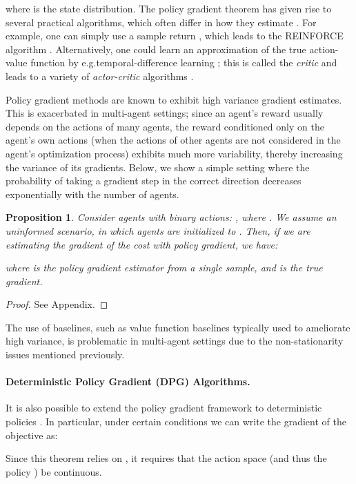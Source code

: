 \documentclass{article}
\newtheorem{prop}{Proposition}
\begin{document}
where  is the state distribution. The policy gradient theorem has given rise to several practical algorithms, which often differ in how they estimate . For example, one can simply use a sample return , which leads to the REINFORCE algorithm \cite{williams1992simple}. 
Alternatively, one could learn an approximation of the true action-value function  by e.g.\@ temporal-difference learning \cite{sutton1998reinforcement}; 
this  is called the \textit{critic} and leads to a variety of \textit{actor-critic} algorithms \cite{sutton1998reinforcement}.

Policy gradient methods are known to exhibit high variance gradient estimates.  This is exacerbated in multi-agent settings; since an agent's reward usually depends on the actions of many agents, the reward conditioned only on the agent's own actions (when the actions of other agents are not considered in the agent's optimization process) exhibits much more variability, thereby increasing the variance of its gradients.
Below, we show a simple setting where the probability of taking a gradient step in the correct direction decreases exponentially with the number of agents. 
\begin{prop}\label{prop:pg}
Consider  agents with binary actions: , where . We assume an uninformed scenario, in which agents are initialized to . Then, if we are estimating the gradient of the cost  with policy gradient, we have:



where  is the policy gradient estimator from a single sample, and  is the true gradient.
\end{prop}

\begin{proof}
See Appendix.
\end{proof}
The use of baselines, such as value function baselines typically used to ameliorate high variance, is problematic in multi-agent settings due to the non-stationarity issues mentioned previously.


\paragraph{Deterministic Policy Gradient (DPG) Algorithms.} It is also possible to extend the policy gradient framework to deterministic policies  \cite{silver2014deterministic}. In particular, under certain conditions we can write the gradient of the objective  as:

Since this theorem relies on , it requires that the action space  (and thus the policy ) be continuous. 
\end{document}
